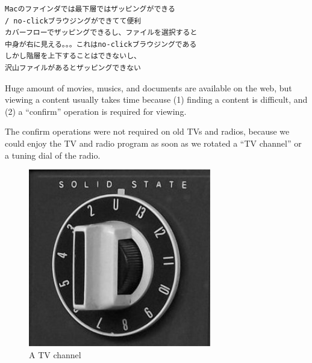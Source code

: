 \documentclass{article}
\begin{document}
\begin{verbatim}
Macのファインダでは最下層ではザッピングができる
/ no-clickブラウジングができてて便利
カバーフローでザッピングできるし、ファイルを選択すると
中身が右に見える。。。これはno-clickブラウジングである
しかし階層を上下することはできないし、
沢山ファイルがあるとザッピングできない
\end{verbatim}

% 

Huge amount of movies, musics, and documents are available on the web, but
viewing a content usually takes time because
(1) finding a content is difficult, and
(2) a ``confirm'' operation is required for viewing.


The confirm operations were not required on old TVs and radios,
because we could enjoy the TV and radio program
as soon as we rotated a ``TV channel'' or a tuning dial of the radio.

\begin{figure}[H]
\centerline{\includegraphics[width=80mm,bb=0 0 279 272]{figures/9bd96506bdaac48b26c5cd192851c11d.png}}
\caption{A TV channel}
\label{TV channel}
\end{figure}

\end{document}
